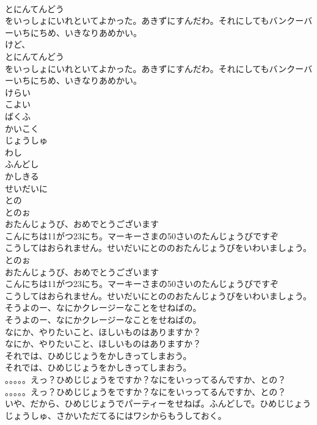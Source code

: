 \documentclass[8pt]{extreport}
\begin{document}
\begin{CJK}{UTF8}{min}
\\	とにんてんどう
\\	をいっしょにいれといてよかった。あきずにすんだわ。それにしてもバンクーバーいちにちめ、いきなりあめかい。
\\	けど、
\\	とにんてんどう
\\	をいっしょにいれといてよかった。あきずにすんだわ。それにしてもバンクーバーいちにちめ、いきなりあめかい。
\\	けらい
\\	こよい
\\	ばくふ
\\	かいこく
\\	じょうしゅ
\\	わし
\\	ふんどし
\\	かしきる
\\	せいだいに
\\	との
\\	とのぉ
\\	おたんじょうび、おめでとうございます
\\	こんにちは11がつ23にち。マーキーさまの50さいのたんじょうびですぞ
\\	こうしてはおられません。せいだいにとののおたんじょうびをいわいましょう。
\\	とのぉ
\\	おたんじょうび、おめでとうございます
\\	こんにちは11がつ23にち。マーキーさまの50さいのたんじょうびですぞ
\\	こうしてはおられません。せいだいにとののおたんじょうびをいわいましょう。
\\	そうよのー、なにかクレージーなことをせねばの。
\\	そうよのー、なにかクレージーなことをせねばの。
\\	なにか、やりたいこと、ほしいものはありますか？
\\	なにか、やりたいこと、ほしいものはありますか？
\\	それでは、ひめじじょうをかしきってしまおう。
\\	それでは、ひめじじょうをかしきってしまおう。
\\	。。。。。えっ？ひめじじょうをですか？なにをいっってるんですか、との？
\\	。。。。。えっ？ひめじじょうをですか？なにをいっってるんですか、との？
\\	いや、だから、ひめじじょうでパーティーをせねば。ふんどしで。ひめじじょうじょうしゅ、さかいただてるにはワシからもうしておく。

\end{CJK}
\end{document}
